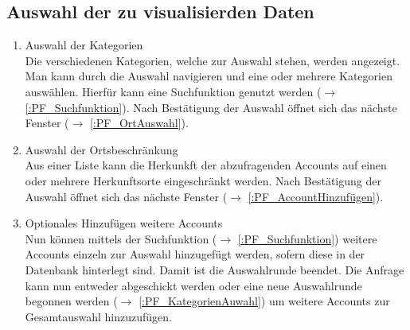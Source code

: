 \subsection{Auswahl der zu visualisierden Daten}
\begin{enumerate}[ align=left, label={\textbf{\textbackslash F10\arabic*0\textbackslash}} ]
	\item Auswahl der Kategorien \label{:PF_KategorienAuswahl}\\ 
	Die verschiedenen Kategorien, welche zur Auswahl stehen, werden angezeigt. Man kann durch die Auswahl navigieren und eine oder mehrere Kategorien auswählen. Hierfür kann eine Suchfunktion genutzt werden ($\rightarrow$ \ref{:PF_Suchfunktion}).  Nach Bestätigung der Auswahl öffnet sich das nächste Fenster ($\rightarrow$ \ref{:PF_OrtAuswahl}).
	\item Auswahl der Ortsbeschränkung \label{:PF_OrtAuswahl} \\
	Aus einer Liste kann die Herkunkft der abzufragenden Accounts auf einen oder mehrere Herkunftsorte eingeschränkt werden. Nach Bestätigung der Auswahl öffnet sich das nächste Fenster ($\rightarrow$ \ref{:PF_AccountHinzufügen}).
	\item Optionales Hinzufügen weitere Accounts \label{:PF_AccountHinzufügen} \\
	Nun können mittels der Suchfunktion ($\rightarrow$ \ref{:PF_Suchfunktion}) weitere Accounts einzeln zur Auswahl hinzugefügt werden, sofern diese in der Datenbank hinterlegt sind. Damit ist die Auswahlrunde beendet. Die Anfrage kann nun entweder abgeschickt werden oder eine neue Auswahlrunde begonnen werden ($\rightarrow$ \ref{:PF_KategorienAuwahl}) um weitere Accounts zur Gesamtauswahl hinzuzufügen.
\end{enumerate}	
